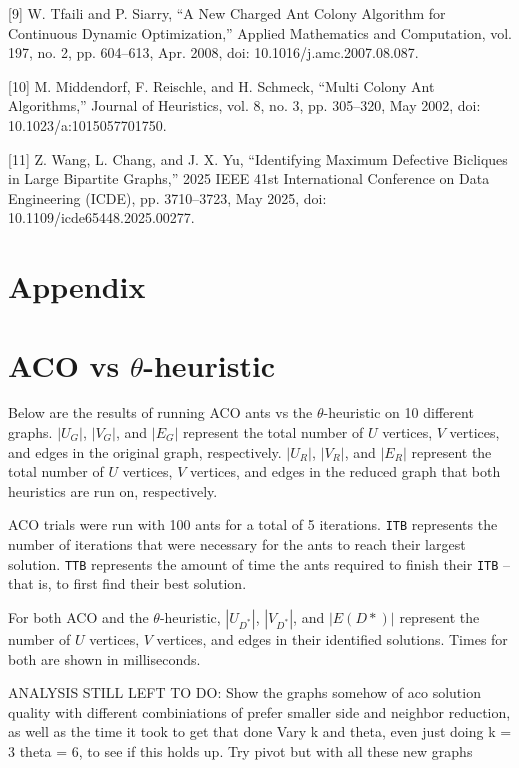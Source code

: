 \documentclass{article}
\begin{document}
[9] W. Tfaili and P. Siarry, “A New Charged Ant Colony Algorithm for Continuous Dynamic Optimization,” Applied Mathematics and Computation, vol. 197, no. 2, pp. 604–613, Apr. 2008, doi: 10.1016/j.amc.2007.08.087.
\

[10] M. Middendorf, F. Reischle, and H. Schmeck, “Multi Colony Ant Algorithms,” Journal of Heuristics, vol. 8, no. 3, pp. 305–320, May 2002, doi: 10.1023/a:1015057701750.
\

[11] Z. Wang, L. Chang, and J. X. Yu, “Identifying Maximum Defective Bicliques in Large Bipartite Graphs,” 2025 IEEE 41st International Conference on Data Engineering (ICDE), pp. 3710–3723, May 2025, doi: 10.1109/icde65448.2025.00277.

\section{Appendix}

\appendix

\section{ACO vs $\theta$-heuristic}

Below are the results of running ACO ants vs the $\theta$-heuristic on 10 different graphs. $|U_G|$, $|V_G|$, and $|E_G|$ represent the total number of $U$ vertices, $V$ vertices, and edges in the original graph, respectively. $|U_R|$, $|V_R|$, and $|E_R|$ represent the total number of $U$ vertices, $V$ vertices, and edges in the reduced graph that both heuristics are run on, respectively.

ACO trials were run with 100 ants for a total of 5 iterations. \texttt{ITB} represents the number of iterations that were necessary for the ants to reach their largest solution. \texttt{TTB} represents the amount of time the ants required to finish their \texttt{ITB} -- that is, to first find their best solution.

For both ACO and the $\theta$-heuristic, $|U_{D^*}|$, $|V_{D^*}|$, and $|E(D*)|$ represent the number of $U$ vertices, $V$ vertices, and edges in their identified solutions. Times for both are shown in milliseconds.


ANALYSIS STILL LEFT TO DO: Show the graphs somehow of aco solution quality with different combiniations of prefer smaller side and neighbor reduction, as well as the time it took to get that done
Vary k and theta, even just doing k = 3 theta = 6, to see if this holds up.
Try pivot but with all these new graphs
\end{document}
